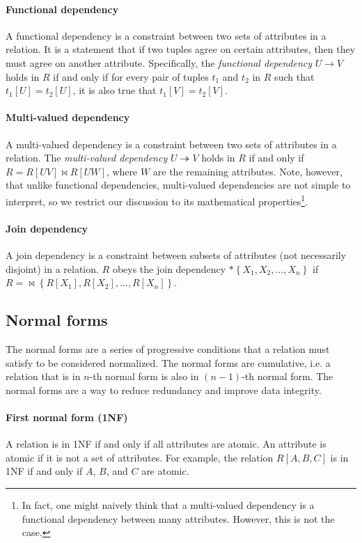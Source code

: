 \paragraph{Functional dependency}  A functional dependency is a constraint between two
sets of attributes in a relation.  It is a statement that if two tuples agree on certain
attributes, then they must agree on another attribute.  Specifically, the \emph{functional
dependency} $U \to V$ holds in $R$ if and only if for every pair of tuples $t_1$ and $t_2$
in $R$ such that $t_1[U] = t_2[U]$, it is also true that $t_1[V] = t_2[V]$.

\paragraph{Multi-valued dependency}  A multi-valued dependency is a constraint between
two sets of attributes in a relation.  The
\emph{multi-valued dependency} $U \twoheadrightarrow V$ holds in $R$ if and only if $R =
R[UV] \bowtie R[UW]$, where $W$ are the remaining attributes.  Note, however, that unlike
functional dependencies, multi-valued dependencies are not simple to interpret, so we
restrict our discussion to its mathematical properties\footnote{In fact, one might
naively think that a multi-valued dependency is a functional dependency between
many attributes.  However, this is not the case.}.

\paragraph{Join dependency}  A join dependency is a constraint between subsets of
attributes (not necessarily disjoint) in a relation.  $R$ obeys the join dependency $*
\left\{ X_1, X_2, \dots, X_n \right\}$ if $R = {\bowtie \left\{ R[X_1], R[X_2], \dots,
R[X_n] \right\}}$.

\subsection{Normal forms}

The normal forms are a series of progressive conditions that a relation must satisfy to
be considered normalized.  The normal forms are cumulative, i.e. a relation that is in
$n$-th normal form is also in $(n-1)$-th normal form.  The normal forms are a way to
reduce redundancy and improve data integrity.

\paragraph{First normal form (1NF)}  A relation is in 1NF if and only if all attributes
are atomic.  An attribute is atomic if it is not a set of attributes.  For example, the
relation $R[A, B, C]$ is in 1NF if and only if $A$, $B$, and $C$ are atomic.

